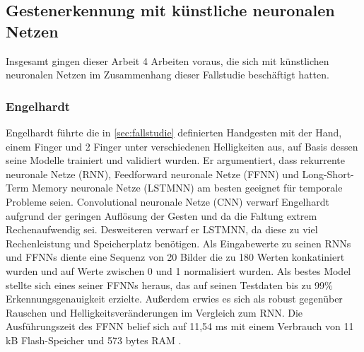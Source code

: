 \subsection{Gestenerkennung mit künstliche neuronalen Netzen}
Insgesamt gingen dieser Arbeit 4 Arbeiten voraus, die sich mit künstlichen neuronalen Netzen im Zusammenhang dieser Fallstudie beschäftigt hatten.
\subsubsection{Engelhardt}
Engelhardt führte die in \ref{sec:fallstudie} definierten Handgesten mit der Hand, einem Finger und 2 Finger unter verschiedenen Helligkeiten aus, auf Basis dessen seine Modelle trainiert und validiert wurden. Er
argumentiert, dass rekurrente neuronale Netze (RNN), Feedforward neuronale Netze (FFNN) und Long-Short-Term Memory neuronale Netze (LSTMNN) am besten geeignet für temporale Probleme seien. Convolutional neuronale
Netze (CNN) verwarf Engelhardt aufgrund der geringen Auflösung der Gesten und da die Faltung extrem Rechenaufwendig sei. Desweiteren verwarf er LSTMNN, da diese zu viel Rechenleistung und Speicherplatz
benötigen. Als Eingabewerte zu seinen RNNs und FFNNs diente eine Sequenz von 20 Bilder die zu 180 Werten konkatiniert wurden und auf Werte zwischen 0 und 1 normalisiert wurden. Als bestes Model stellte sich eines
seiner FFNNs heraus, das auf seinen Testdaten bis zu 99\% Erkennungsgenauigkeit erzielte. Außerdem erwies es sich als robust gegenüber Rauschen und Helligkeitsveränderungen im Vergleich zum RNN. Die Ausführungszeit
des FFNN belief sich auf 11,54 ms mit einem Verbrauch von 11 kB Flash-Speicher und 573 bytes RAM \cite{engelhardtThesis}.

